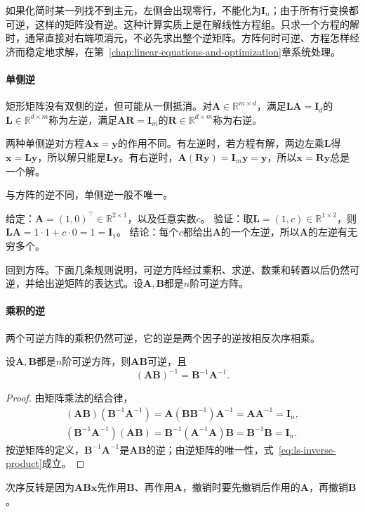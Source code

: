 如果化简时某一列找不到主元，左侧会出现零行，不能化为$\bm I_n$；由于所有行变换都可逆，这样的矩阵没有逆。这种计算实质上是在解线性方程组。只求一个方程的解时，通常直接对右端项消元，不必先求出整个逆矩阵。方阵何时可逆、方程怎样经济而稳定地求解，在第~\ref{chap:linear-equations-and-optimization}章系统处理。

\paragraph{单侧逆}
矩形矩阵没有双侧的逆，但可能从一侧抵消。对$\bm A\in\mathbb R^{m\times d}$，满足$\bm L\bm A=\bm I_d$的$\bm L\in\mathbb R^{d\times m}$称为左逆，满足$\bm A\bm R=\bm I_m$的$\bm R\in\mathbb R^{d\times m}$称为右逆。

两种单侧逆对方程$\bm A\bm x=\bm y$的作用不同。有左逆时，若方程有解，两边左乘$\bm L$得$\bm x=\bm L\bm y$，所以解只能是$\bm L\bm y$。有右逆时，$\bm A(\bm R\bm y)=\bm I_m\bm y=\bm y$，所以$\bm x=\bm R\bm y$总是一个解。

与方阵的逆不同，单侧逆一般不唯一。
\begin{example}[反例：左逆不唯一]
\label{ex:ls-left-inverse-not-unique}
给定：$\bm A=(1,0)^\top\in\mathbb R^{2\times1}$，以及任意实数$c$。
验证：取$\bm L=(1,c)\in\mathbb R^{1\times2}$，则$\bm L\bm A=1\cdot1+c\cdot0=1=\bm I_1$。
结论：每个$c$都给出$\bm A$的一个左逆，所以$\bm A$的左逆有无穷多个。
\end{example}

回到方阵。下面几条规则说明，可逆方阵经过乘积、求逆、数乘和转置以后仍然可逆，并给出逆矩阵的表达式。设$\bm A,\bm B$都是$n$阶可逆方阵。

\paragraph{乘积的逆}
两个可逆方阵的乘积仍然可逆，它的逆是两个因子的逆按相反次序相乘。
\begin{theorem}[乘积的逆]
\label{thm:ls-inverse-product}
设$\bm A,\bm B$都是$n$阶可逆方阵，则$\bm A\bm B$可逆，且
\begin{equation}
 (\bm A\bm B)^{-1}=\bm B^{-1}\bm A^{-1}.
 \label{eq:ls-inverse-product}
\end{equation}
\end{theorem}
\begin{proof}
由矩阵乘法的结合律，
\[
 \begin{gathered}
 (\bm A\bm B)(\bm B^{-1}\bm A^{-1})=\bm A(\bm B\bm B^{-1})\bm A^{-1}=\bm A\bm A^{-1}=\bm I_n,\\
 (\bm B^{-1}\bm A^{-1})(\bm A\bm B)=\bm B^{-1}(\bm A^{-1}\bm A)\bm B=\bm B^{-1}\bm B=\bm I_n.
 \end{gathered}
\]
按逆矩阵的定义，$\bm B^{-1}\bm A^{-1}$是$\bm A\bm B$的逆；由逆矩阵的唯一性，式~\eqref{eq:ls-inverse-product}成立。
\end{proof}
次序反转是因为$\bm A\bm B\bm x$先作用$\bm B$、再作用$\bm A$，撤销时要先撤销后作用的$\bm A$，再撤销$\bm B$。

